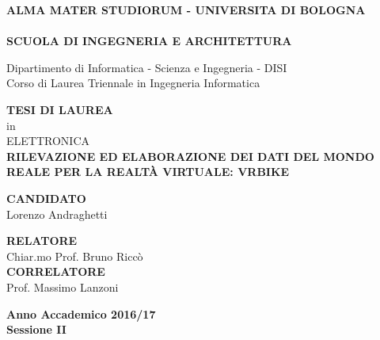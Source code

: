 \thispagestyle{empty}
\begin{titlepage}
\setlength{\textwidth}{450pt}


\vspace*{-2.5cm}
\begin{center}
  \textbf{ALMA MATER STUDIORUM - UNIVERSITA DI BOLOGNA}\\
  \vspace*{-.38cm}
  \hrulefill\\
  
  \textbf{SCUOLA DI INGEGNERIA  E ARCHITETTURA}\\
  \vspace*{.75cm}
  
  
  Dipartimento di Informatica - Scienza e Ingegneria - DISI\\
  Corso di Laurea Triennale in Ingegneria Informatica\\
  
  \vspace*{1.2cm}
  
  
  \textbf{TESI DI LAUREA}\\
  \vspace*{.4cm}
  in\\
  \vspace*{.4cm}
  ELETTRONICA\\

  \vspace*{3.2cm} \Large
  \textbf{RILEVAZIONE ED ELABORAZIONE DEI DATI DEL MONDO REALE PER LA REALTÀ VIRTUALE: VRBIKE}\\
 \end{center}
 
 \vspace*{3.8cm}
 
 \begin{flushleft}
  \textbf{CANDIDATO}\\ Lorenzo Andraghetti \\
\end{flushleft}

\vspace*{-1.8cm}

 \begin{flushright}
  \textbf{RELATORE}\\ Chiar.mo Prof. Bruno Riccò \\
  \vspace*{0.8cm}
  \textbf{CORRELATORE}\\ Prof. Massimo Lanzoni
 \end{flushright}

   
\vspace*{1.5cm}

\begin{center}
	\textbf{
  Anno Accademico 2016/17\\
  Sessione II
  }
\end{center} 
\clearpage
\end{titlepage}
\setlength{\textwidth}{380pt}